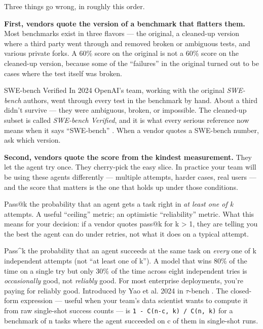 Three things go wrong, in roughly this order.

\textbf{First, vendors quote the version of a benchmark that flatters them.} Most benchmarks exist in three flavors --- the original, a cleaned-up version where a third party went through and removed broken or ambiguous tests, and various private forks. A 60\% score on the original is not a 60\% score on the cleaned-up version, because some of the ``failures'' in the original turned out to be cases where the test itself was broken.

\begin{TNinpractice}{SWE-bench Verified} In 2024 OpenAI's team, working with the original \textit{SWE-bench} authors, went through every test in the benchmark by hand. About a third didn't survive --- they were ambiguous, broken, or impossible. The cleaned-up subset is called \textit{SWE-bench Verified}, and it is what every serious reference now means when it says ``SWE-bench'' \citep{jimenez2024swebench,openai-swebench-verified-2024}. When a vendor quotes a SWE-bench number, ask which version. \end{TNinpractice}

\textbf{Second, vendors quote the score from the kindest measurement.} They let the agent try once. They cherry-pick the easy slice. In practice your team will be using these agents differently --- multiple attempts, harder cases, real users --- and the score that matters is the one that holds up under those conditions.

\begin{TNdefinition}{Pass@k} the probability that an agent gets a task right in \textit{at least one of k} attempts. A useful ``ceiling'' metric; an optimistic ``reliability'' metric. What this means for your decision: if a vendor quotes pass@k for k > 1, they are telling you the best the agent can do under retries, not what it does on a typical attempt. \end{TNdefinition}

\begin{TNdefinition}{Pass\textasciicircum k} the probability that an agent succeeds at the same task on \textit{every} one of k independent attempts (not ``at least one of k''). A model that wins 80\% of the time on a single try but only 30\% of the time across eight independent tries is \textit{occasionally} good, not \textit{reliably} good. For most enterprise deployments, you're paying for reliably good. Introduced by Yao et al. 2024 in $\tau$-bench \citep{yao2024taubench}. The closed-form expression --- useful when your team's data scientist wants to compute it from raw single-shot success counts --- is \texttt{1 - C(n-c, k) / C(n, k)} for a benchmark of n tasks where the agent succeeded on c of them in single-shot runs. \end{TNdefinition}

